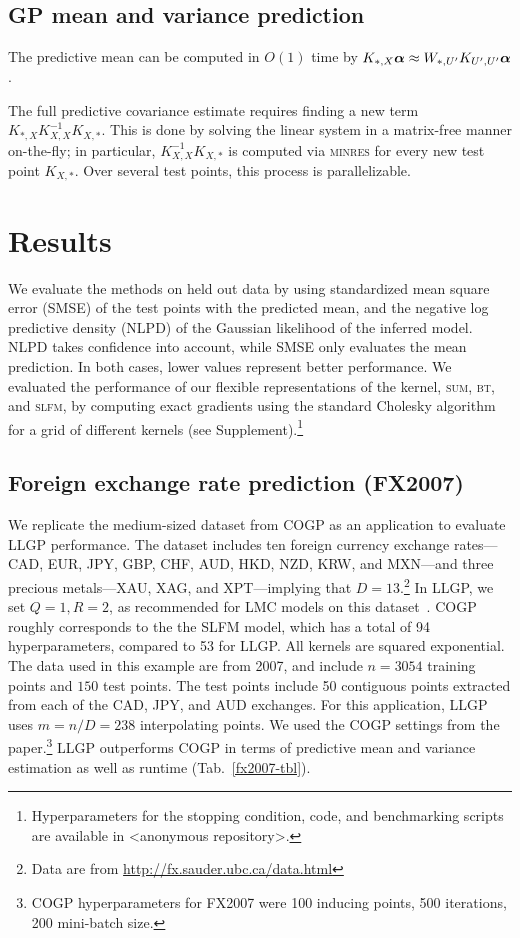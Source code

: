 \documentclass{article}
\begin{document}
\subsection{GP mean and variance prediction}

The predictive mean can be computed in $O(1)$ time by $K_{*,X}{\boldsymbol\alpha}\approx W_{*,{U'}}K_{{U'},{U'}}{\boldsymbol\alpha}$ \cite{msgp}.

The full predictive covariance estimate requires finding a new term $K_{*,X}K_{X,X}^{-1}K_{X,*}$. This is done by solving the linear system in a matrix-free manner on-the-fly; in particular, $K_{X,X}^{-1}K_{X,*}$ is computed via \textsc{minres} for every new test point $K_{X,*}$. Over several test points, this process is parallelizable.

\section{Results}
\label{sec:results}
We evaluate the methods on held out data by using standardized mean square error (SMSE) of the test points with the predicted mean, and the negative log predictive density (NLPD) of the Gaussian likelihood of the inferred model. NLPD takes confidence into account, while SMSE only evaluates the mean prediction. In both cases, lower values represent better performance. We evaluated the performance of our flexible representations of the kernel, \textsc{sum}, \textsc{bt}, and \textsc{slfm}, by computing exact gradients using the standard Cholesky algorithm for a grid of different kernels (see Supplement).\footnote{Hyperparameters for the stopping condition, code, and benchmarking scripts are available in <anonymous repository>.}

\subsection{Foreign exchange rate prediction (FX2007)}\label{fx2007-results}

We replicate the medium-sized dataset from COGP as an application to evaluate LLGP performance. The dataset includes ten foreign currency exchange rates---CAD, EUR, JPY, GBP, CHF, AUD, HKD, NZD, KRW, and MXN---and three precious metals---XAU, XAG, and XPT---implying that $D=13$.\footnote{Data are from \url{http://fx.sauder.ubc.ca/data.html}} In LLGP, we set $Q=1,R=2$, as recommended for LMC models on this dataset~\cite{alvarez2010efficient}. COGP roughly corresponds to the the SLFM model, which has a total of 94 hyperparameters, compared to 53 for LLGP. All kernels are squared exponential. The data used in this example are from 2007, and include $n=3054$ training points and $150$ test points. The test points include 50 contiguous points extracted from each of the CAD, JPY, and AUD exchanges. For this application, LLGP uses $m=n/D=238$ interpolating points. We used the COGP settings from the paper.\footnote{COGP hyperparameters for FX2007 were 100 inducing points, 500 iterations, 200 mini-batch size.} LLGP outperforms COGP in terms of predictive mean and variance estimation as well as runtime (Tab.~\ref{fx2007-tbl}).
\end{document}
